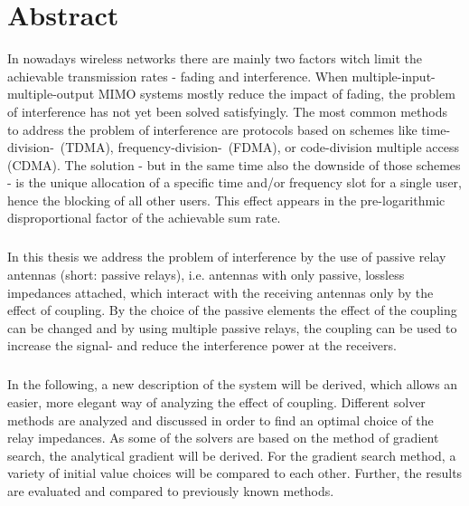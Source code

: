 \chapter*{Abstract}

In nowadays wireless networks there are mainly two factors witch limit the achievable transmission rates - fading and interference.
When multiple-input-multiple-output MIMO systems mostly reduce the impact of fading, the problem of interference has not yet been solved satisfyingly.
The most common methods to address the problem of interference are protocols based on schemes like time-division-~(TDMA), frequency-division-~(FDMA), or code-division multiple access (CDMA).
The solution - but in the same time also the downside of those schemes - is the unique allocation of a specific time and/or frequency slot for a single user, hence the blocking of all other users.
This effect appears in the pre-logarithmic disproportional factor of the achievable sum rate.
\paragraph{}
In this thesis we address the problem of interference by the use of passive relay antennas (short: passive relays), i.e. antennas with only passive, lossless impedances attached, which interact with the receiving antennas only by the effect of coupling.
By the choice of the passive elements the effect of the coupling can be changed and by using multiple passive relays, the coupling can be used to increase the signal- and reduce the interference power at the receivers.
\paragraph{}
In the following, a new description of the system will be derived, which allows an easier, more elegant way of analyzing the effect of coupling.
Different solver methods are analyzed and discussed in order to find an optimal choice of the relay impedances.
As some of the solvers are based on the method of gradient search, the analytical gradient will be derived.
For the gradient search method, a variety of initial value choices will be compared to each other.
Further, the results are evaluated and compared to previously known methods.
